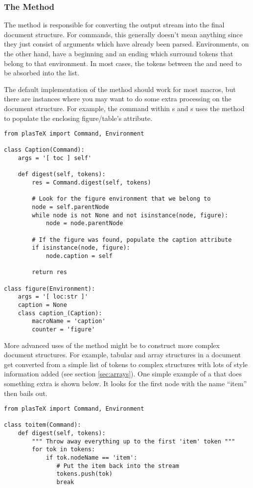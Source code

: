 \subsubsection{The  Method}

The  method is responsible for converting the output
stream into the final document structure.  For commands, this generally
doesn't mean anything since they just consist of arguments which
have already been parsed.  Environments, on the other hand, have a
beginning and an ending which surround tokens that belong to that
environment.  In most cases, the tokens between the 
and  need to be absorbed into the 
list.

The default implementation of the  method should work
for most macros, but there are instances where you may want to
do some extra processing on the document structure.  For example,
the  command within s and
s uses the  method to populate
the enclosing figure/table's  attribute.
\begin{verbatim}
from plasTeX import Command, Environment

class Caption(Command):
    args = '[ toc ] self'

    def digest(self, tokens):
        res = Command.digest(self, tokens)

        # Look for the figure environment that we belong to
        node = self.parentNode
        while node is not None and not isinstance(node, figure):
            node = node.parentNode

        # If the figure was found, populate the caption attribute
        if isinstance(node, figure):
            node.caption = self

        return res

class figure(Environment):
    args = '[ loc:str ]'
    caption = None
    class caption_(Caption):
        macroName = 'caption'
        counter = 'figure'
\end{verbatim}

More advanced uses of the  method might be to construct
more complex document structures.  For example, tabular and array
structures in a document get converted from a simple list of tokens
to complex structures with lots of style information added (see section
\ref{sec:arrays}).  One simple example of a  that
does something extra is shown below.  It looks for the first
node with the name ``item'' then bails out.
\begin{verbatim}
from plasTeX import Command, Environment

class toitem(Command):
    def digest(self, tokens):
        """ Throw away everything up to the first 'item' token """
        for tok in tokens:
            if tok.nodeName == 'item':
               # Put the item back into the stream
               tokens.push(tok)
               break
\end{verbatim}

